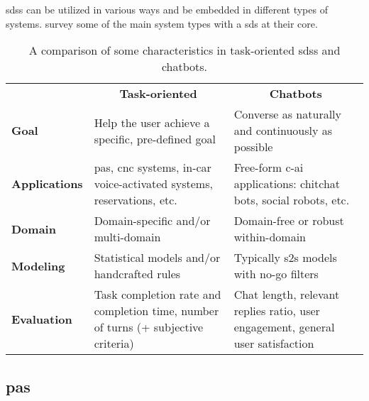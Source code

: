 \Acp{sds} can be utilized in various ways and be embedded in different types of systems.
 survey some of the main system types with a \ac{sds} at their core.
%
\begin{table}[tb]
	\centering
	\caption[Types of \aclp{sds}: Task-oriented vs.\ Chatbots]{A comparison of some characteristics in task-oriented \acp{sds} and chatbots.}
	\label{tab:sds_types}
	\begin{tabularx}{\linewidth}{>{\bfseries}lp{.38\linewidth}p{.37\linewidth}}
		\toprule
		\vspace{.3cm}
							& \multicolumn{1}{c}{{\large \textbf{Task-oriented}}} & \multicolumn{1}{c}{{\large \textbf{Chatbots}}} \\
		\vspace{.2cm}
		Goal				& Help the user achieve a specific, pre-defined goal
							& Converse as naturally and continuously as possible \\
		\vspace{.2cm}
		Applications		& \Aclp{pa}, \ac{cnc} systems, in-car voice-activated systems, reservations, etc.
							& Free-form \acl{c-ai} applications: chitchat bots, social robots, etc. \\
		\vspace{.2cm}
		Domain				& Domain-specific and/or multi-domain
							& Domain-free or robust within-domain \\
		\vspace{.2cm}
		Modeling			& Statistical models and/or handcrafted rules
							& Typically \ac{s2s} models with no-go filters \\
		\vspace{.2cm}
		Evaluation			& Task completion rate and completion time, number of turns (+ subjective criteria)
							& Chat length, relevant replies ratio, user engagement, general user satisfaction \\
		\bottomrule
	\end{tabularx}
\end{table}
%
\subsection{\Aclp{pa}}
\label{subsec:personal_assistants}

